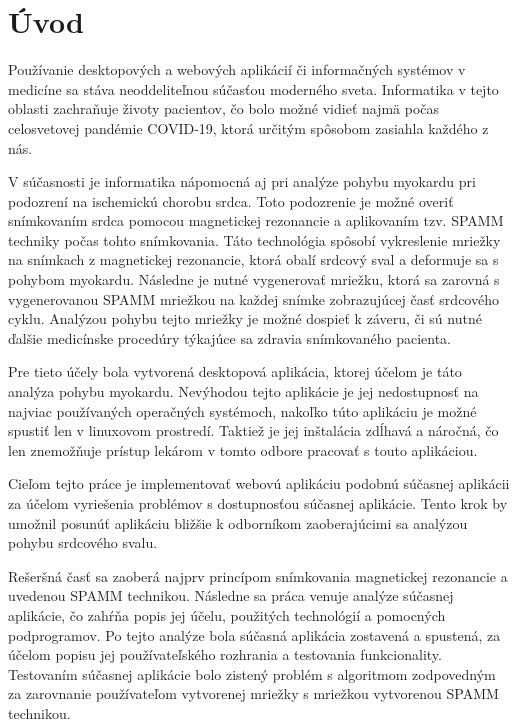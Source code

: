 \chapter {Úvod}
Používanie desktopových a webových aplikácií či informačných systémov v medicíne sa stáva neoddeliteľnou súčasťou moderného sveta. Informatika v tejto oblasti zachraňuje životy pacientov, čo bolo možné vidieť najmä počas celosvetovej pandémie COVID-19, ktorá určitým spôsobom zasiahla každého z nás.

V súčasnosti je informatika nápomocná aj pri analýze pohybu myokardu pri podozrení na ischemickú chorobu srdca. Toto podozrenie je možné overiť snímkovaním srdca pomocou magnetickej rezonancie a aplikovaním tzv. SPAMM techniky počas tohto snímkovania. Táto technológia spôsobí vykreslenie mriežky na snímkach z magnetickej rezonancie, ktorá obalí srdcový sval a deformuje sa s pohybom myokardu. Následne je nutné vygenerovať mriežku, ktorá sa zarovná s vygenerovanou SPAMM mriežkou na každej snímke zobrazujúcej časť srdcového cyklu. Analýzou pohybu tejto mriežky je možné dospieť k záveru, či sú nutné ďalšie medicínske procedúry týkajúce sa zdravia snímkovaného pacienta.

Pre tieto účely bola vytvorená desktopová aplikácia, ktorej účelom je táto analýza pohybu myokardu. Nevýhodou tejto aplikácie je jej nedostupnosť na najviac používaných operačných systémoch, nakoľko túto aplikáciu je možné spustiť len v linuxovom prostredí. Taktiež je jej inštalácia zdĺhavá a náročná, čo len znemožňuje prístup lekárom v tomto odbore pracovať s touto aplikáciou.

Cieľom tejto práce je implementovať webovú aplikáciu podobnú súčasnej aplikácii za účelom vyriešenia problémov s dostupnosťou súčasnej aplikácie. Tento krok by umožnil posunúť aplikáciu bližšie k odborníkom zaoberajúcimi sa analýzou pohybu srdcového svalu.

Rešeršná časť sa zaoberá najprv princípom snímkovania magnetickej rezonancie a uvedenou SPAMM technikou. Následne sa práca venuje analýze súčasnej aplikácie, čo zahŕňa popis jej účelu, použitých technológií a pomocných podprogramov. Po tejto analýze bola súčasná aplikácia zostavená a spustená, za účelom popisu jej používateľského rozhrania a testovania funkcionality. Testovaním súčasnej aplikácie bolo zistený problém s algoritmom zodpovedným za zarovnanie používateľom vytvorenej mriežky s mriežkou vytvorenou SPAMM technikou.

